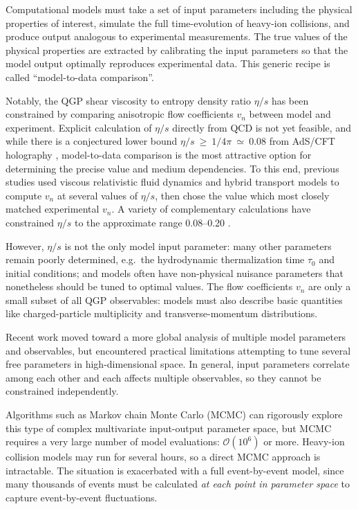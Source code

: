 \documentclass[aps,prc,reprint,superscriptaddress,amsmath]{revtex4-1}
\begin{document}
Computational models must take a set of input parameters including the physical properties of interest, simulate the full time-evolution of heavy-ion collisions, and produce output analogous to experimental measurements.
The true values of the physical properties are extracted by calibrating the input parameters so that the model output optimally reproduces experimental data.
This generic recipe is called ``model-to-data comparison''.

Notably, the QGP shear viscosity to entropy density ratio $\eta/s$ has been constrained by comparing anisotropic flow coefficients $v_n$ between model and experiment.
Explicit calculation of $\eta/s$ directly from QCD is not yet feasible, and while there is a conjectured lower bound $\eta/s~\geq~1/4\pi~\simeq~0.08$ from AdS/CFT holography \cite{Kovtun:2004de}, model-to-data comparison is the most attractive option for determining the precise value and medium dependencies.
To this end, previous studies used viscous relativistic fluid dynamics and hybrid transport models to compute $v_n$ at several values of $\eta/s$, then chose the value which most closely matched experimental $v_n$.
A variety of complementary calculations have constrained $\eta/s$ to the approximate range 0.08--0.20 \cite{Luzum:2008cw,Song:2010mg,Schenke:2010rr}.

However, $\eta/s$ is not the only model input parameter:
many other parameters remain poorly determined, e.g.~the hydrodynamic thermalization time $\tau_0$ and initial conditions; and models often have non-physical nuisance parameters that nonetheless should be tuned to optimal values.
The flow coefficients $v_n$ are only a small subset of all QGP observables:
models must also describe basic quantities like charged-particle multiplicity and transverse-momentum distributions.

Recent work \cite{Soltz:2012rk} moved toward a more global analysis of multiple model parameters and observables, but encountered practical limitations attempting to tune several free parameters in high-dimensional space.
In general, input parameters correlate among each other and each affects multiple observables, so they cannot be constrained independently.

Algorithms such as Markov chain Monte Carlo (MCMC) can rigorously explore this type of complex multivariate input-output parameter space, but MCMC requires a very large number of model evaluations: $\mathcal O(10^6)$ or more.
Heavy-ion collision models may run for several hours, so a direct MCMC approach is intractable.
The situation is exacerbated with a full event-by-event model, since many thousands of events must be calculated \emph{at each point in parameter space} to capture event-by-event fluctuations.
\end{document}
